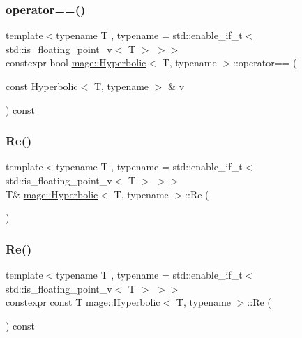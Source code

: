 \subsubsection{\texorpdfstring{operator==()}{operator==()}}
{\footnotesize\ttfamily template$<$typename T , typename  = std\+::enable\+\_\+if\+\_\+t$<$ std\+::is\+\_\+floating\+\_\+point\+\_\+v$<$ T $>$ $>$$>$ \\
constexpr bool \mbox{\hyperlink{structmage_1_1_hyperbolic}{mage\+::\+Hyperbolic}}$<$ T, typename $>$\+::operator== (\begin{DoxyParamCaption}\item[{const \mbox{\hyperlink{structmage_1_1_hyperbolic}{Hyperbolic}}$<$ T, typename $>$ \&}]{v }\end{DoxyParamCaption}) const}

\mbox{\label{structmage_1_1_hyperbolic_a381a404eb017725183d573c12f3372b3}} 
\subsubsection{\texorpdfstring{Re()}{Re()}\hspace{0.1cm}{\footnotesize\ttfamily [1/2]}}
{\footnotesize\ttfamily template$<$typename T , typename  = std\+::enable\+\_\+if\+\_\+t$<$ std\+::is\+\_\+floating\+\_\+point\+\_\+v$<$ T $>$ $>$$>$ \\
T\& \mbox{\hyperlink{structmage_1_1_hyperbolic}{mage\+::\+Hyperbolic}}$<$ T, typename $>$\+::Re (\begin{DoxyParamCaption}{ }\end{DoxyParamCaption})\hspace{0.3cm}{\ttfamily [noexcept]}}

\mbox{\label{structmage_1_1_hyperbolic_ad4affddcdd90c6f8e88c9fad6070b414}} 
\subsubsection{\texorpdfstring{Re()}{Re()}\hspace{0.1cm}{\footnotesize\ttfamily [2/2]}}
{\footnotesize\ttfamily template$<$typename T , typename  = std\+::enable\+\_\+if\+\_\+t$<$ std\+::is\+\_\+floating\+\_\+point\+\_\+v$<$ T $>$ $>$$>$ \\
constexpr const T \mbox{\hyperlink{structmage_1_1_hyperbolic}{mage\+::\+Hyperbolic}}$<$ T, typename $>$\+::Re (\begin{DoxyParamCaption}{ }\end{DoxyParamCaption}) const\hspace{0.3cm}{\ttfamily [noexcept]}}

